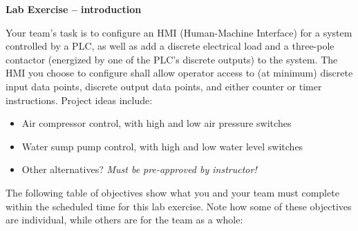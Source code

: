 

\noindent
{\bf Lab Exercise -- introduction}

\vskip 5pt

Your team's task is to configure an HMI (Human-Machine Interface) for a system controlled by a PLC, as well as add a discrete electrical load and a three-pole contactor (energized by one of the PLC's discrete outputs) to the system.  The HMI you choose to configure shall allow operator access to (at minimum) discrete input data points, discrete output data points, and either counter or timer instructions.  Project ideas include:

\begin{itemize}
\item{} Air compressor control, with high and low air pressure switches
\vskip 5pt
\item{} Water sump pump control, with high and low water level switches
\vskip 5pt
\item{} Other alternatives? {\it Must be pre-approved by instructor!}
\end{itemize}

The following table of objectives show what you and your team must complete within the scheduled time for this lab exercise.  Note how some of these objectives are individual, while others are for the team as a whole:

\vskip 10pt



